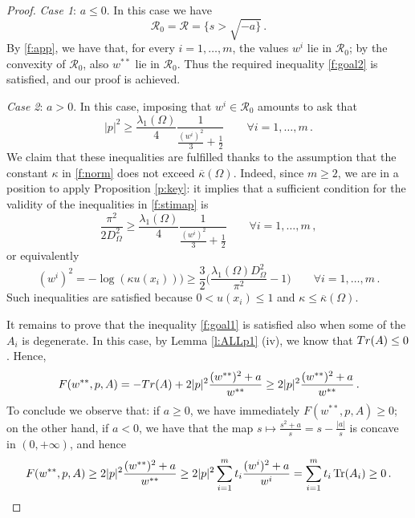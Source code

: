 \documentclass[10pt,a4paper]{amsart}
\def\Om{\Omega}
\DeclareMathOperator{\Tr}{Tr}
\def\k{\kappa}
\begin{document}
\begin{proof}
 \smallskip
 {\it Case 1}:  $a \leq 0$. In this case we have 
 $${\mathcal R}_0=  \mathcal R = \{ s > \sqrt { - a \}}\,. $$ 
 By \eqref{f:app}, we have that, for every $i = 1, \dots, m$,  the values $w ^ i$ lie in $\mathcal R _0$; by the convexity of $\mathcal R _0$, also  $w ^{**}$ lie in $\mathcal R _0$. Thus
 the required inequality \eqref{f:goal2} is satisfied, and our proof is achieved.
 
 \smallskip 
  {\it Case 2}:  $a >0$. In this case,  imposing that $w ^ i \in \mathcal R _0$ amounts to ask that 
\begin{equation}\label{f:stimap}
|p| ^2\geq \frac{\lambda _ 1 (\Om) }{4} \frac{1}{\frac{ (w ^ i) ^ 2}{3} + \frac {1}{2}  } \qquad \forall i = 1, \dots, m \,.
\end{equation}
We claim that these inequalities are fulfilled thanks to the assumption that the constant $\kappa$ in \eqref{f:norm} does not exceed $\overline \kappa (\Om)$. 
Indeed, since $m \geq 2$, we are in a position to apply Proposition \ref{p:key}: it implies that
a sufficient condition for the validity of the inequalities in  \eqref{f:stimap} is 
 $$ \frac{\pi ^ 2}{2 D _\Om ^ 2} \geq   \frac{\lambda _ 1 (\Om) }{4} \frac{1}{\frac{ (w ^ i ) ^ 2}{3} + \frac {1}{2}  } \qquad \forall i = 1, \dots, m \,, $$ 
 or equivalently 
 $$( w^i ) ^ 2 =  - \log (\k u(x_i)) )   \geq  \frac 3 2 \Big ( \frac{ \lambda _ 1 (\Om) D _\Om^2  }{\pi ^ 2}  -1 \Big )  \qquad \forall i = 1, \dots, m   \,.$$ 
Such inequalities are satisfied  because  $0 < u (x_i) \leq 1$ and  $\kappa  \leq \overline \kappa (\Omega)$.  

 \smallskip
It remains to prove that  the inequality 
\eqref{f:goal1}  is satisfied also when some of the $A_i$ is degenerate. In this case, by  Lemma \ref{l:ALLp1} (iv), we know that ${\rm Tr} (A) \leq 0$. Hence,  
 $$
F (w^{**}, p, A ) 
 =  - {\rm Tr} ( A)  +  2|p|^ 2 \frac{( w^ {**} ) ^2 +a   }{w^{**}  }  \geq  2|p|^ 2 \frac{( w^ {**} ) ^2 +a   }{w^{**}  } \,.
$$
To conclude we observe that: if $a \geq 0$, we have immediately   $
 F (w^{**}, p, A ) \geq 0$; on the other hand, if $a <0$, we have that 
 the map $s \mapsto \frac{ s ^ 2 + a}{s} = s - \frac{|a|}{s}$ is concave in $(0, + \infty)$, and hence
 \[
 F (w^{**}, p, A )\geq  2|p|^ 2 \frac{( w^ {**} ) ^2 +a   }{w^{**}  }  \geq 2|p|^ 2  \sum _ {i= 1} ^m t_i \frac{ (w^ i )  ^ 2 + a}{w^ i}  =    \sum _ {i= 1} ^ m  t_i \Tr (A_i)  \geq 0 \,.
 \qedhere
\]
\end{proof}
\end{document}
